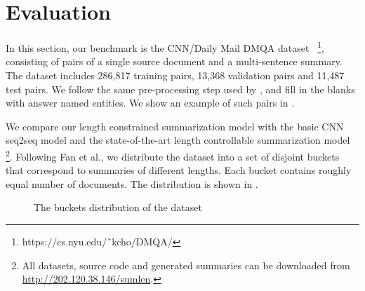 \section{Evaluation}
\label{sec:eval}

In this section, our benchmark is the CNN/Daily
Mail DMQA dataset~\cite{HermannKGEKSB15,NallapatiZSGX16,SeeLM17}
\footnote{https://cs.nyu.edu/˜kcho/DMQA/},
consisting of pairs of a single source document and a multi-sentence summary.
The dataset includes 286,817 training pairs,
13,368 validation pairs and 11,487 test pairs.
We follow the same pre-processing step used by \citet{SeeLM17},
and fill in the blanks with answer named entities.
We show an example of such pairs in .

We compare our length constrained summarization model with
the basic CNN seq2seq model and the state-of-the-art
length controllable summarization model \cite{abs-1711-05217}
\footnote{All datasets, source code and generated summaries
can be downloaded from \url{http://202.120.38.146/sumlen}.}. 
Following Fan et al.,
we distribute the dataset into a set of disjoint buckets that
correspond to summaries of different lengths. Each 
bucket contains roughly equal number of documents.  
The distribution is shown in .

\begin{figure}[th!]
\centering
{}
\caption{The buckets distribution of the dataset} \label{fig:buckets}
\end{figure}


